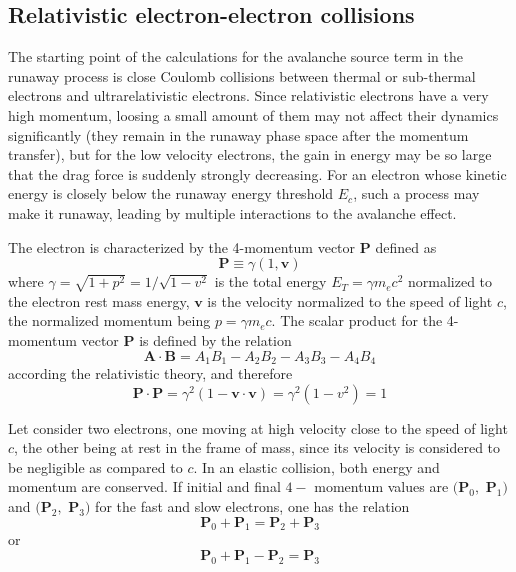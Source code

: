                       

\label{largepitchangle}

\subsection{Relativistic electron-electron collisions}

The starting point of the calculations for the avalanche source term in the
runaway process is close Coulomb collisions between thermal or sub-thermal
electrons and ultrarelativistic electrons. Since relativistic electrons have
a very high momentum, loosing a small amount of them may not affect their
dynamics significantly (they remain in the runaway phase space after the
momentum transfer), but for the low velocity electrons, the gain in energy
may be so large that the drag force is suddenly strongly decreasing. For an
electron whose kinetic energy is closely below the runaway energy threshold $%
E_{c}$, such a process may make it runaway, leading by multiple interactions
to the avalanche effect.

The electron is characterized by the 4-momentum vector $\mathbf{P}$ defined
as 
\begin{equation}
\mathbf{P\equiv }\gamma \left( 1,\mathbf{v}\right) 
\end{equation}%
where $\gamma =\sqrt{1+p^{2}}=1/\sqrt{1-v^{2}}$ is the total energy $%
E_{T}=\gamma m_{e}c^{2}$ normalized to the electron rest mass energy, $%
\mathbf{v}$ is the velocity normalized to the speed of light $c$, the
normalized momentum being $p=\gamma m_{e}c$. The scalar product for the
4-momentum vector $\mathbf{P}$ is defined by the relation 
\begin{equation}
\mathbf{A\cdot B=}A_{1}B_{1}-A_{2}B_{2}-A_{3}B_{3}-A_{4}B_{4}
\end{equation}%
according the relativistic theory, and therefore 
\begin{equation}
\mathbf{P\cdot P=}\gamma ^{2}\left( 1-\mathbf{v\cdot v}\right) =\gamma
^{2}\left( 1-v^{2}\right) =1
\end{equation}

Let consider two electrons, one moving at high velocity close to the speed
of light $c$, the other being at rest in the frame of mass, since its
velocity is considered to be negligible as compared to $c$. In an elastic
collision, both energy and momentum are conserved. If initial and final $4-$%
momentum values are $(\mathbf{P}_{0}\mathbf{,}$ $\mathbf{P}_{1}\mathbf{)}$
and $(\mathbf{P}_{2}\mathbf{,}$ $\mathbf{P}_{3}\mathbf{)}$ for the fast and
slow electrons, one has the relation 
\begin{equation}
\mathbf{P}_{0}+\mathbf{P}_{1}=\mathbf{P}_{2}+\mathbf{P}_{3}
\end{equation}
or 
\begin{equation}
\mathbf{P}_{0}+\mathbf{P}_{1}-\mathbf{P}_{2}=\mathbf{P}_{3}
\end{equation}

